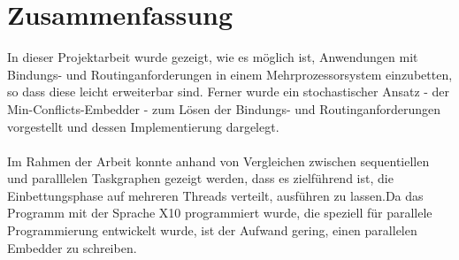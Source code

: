 \chapter{Zusammenfassung}\label{zusammenfassung}

In dieser Projektarbeit wurde gezeigt, wie es möglich ist, Anwendungen mit Bindungs- und Routinganforderungen in einem Mehrprozessorsystem einzubetten, so dass diese leicht erweiterbar sind. Ferner wurde ein stochastischer Ansatz - der Min-Conflicts-Embedder - zum Lösen der Bindungs- und Routinganforderungen vorgestellt und dessen Implementierung dargelegt.\\
\\
Im Rahmen der Arbeit konnte anhand von Vergleichen zwischen sequentiellen und paralllelen Taskgraphen gezeigt werden, dass es zielführend ist, die Einbettungsphase auf mehreren Threads verteilt, ausführen zu lassen.Da das Programm mit der Sprache X10 programmiert wurde, die speziell für parallele Programmierung entwickelt wurde, ist der Aufwand gering, einen parallelen Embedder zu schreiben.

